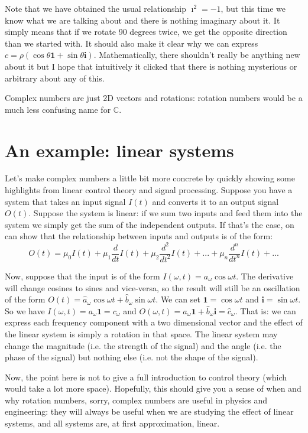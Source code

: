 \documentclass[aps,pra,10pt,floatfix,nofootinbib]{revtex4-1}
\theoremstyle{definition}
\begin{document}
Note that we have obtained the usual relationship $\imath^2=-1$, but this time we know what we are talking about and there is nothing imaginary about it. It simply means that if we rotate 90 degrees twice, we get the opposite direction than we started with. It should also make it clear why we can express $c=\rho (\cos \theta \mathbf{1} + \sin \theta \mathbf{i})$. Mathematically, there shouldn't really be anything new about it but I hope that intuitively it clicked that there is nothing mysterious or arbitrary about any of this.

Complex numbers are just 2D vectors and rotations: rotation numbers would be a much less confusing name for $\mathbb{C}$.

\section{An example: linear systems}

Let's make complex numbers a little bit more concrete by quickly showing some highlights from linear control theory and signal processing. Suppose you have a system that takes an input signal $I(t)$ and converts it to an output signal $O(t)$. Suppose the system is linear: if we sum two inputs and feed them into the system we simply get the sum of the independent outputs. If that's the case, on can show that the relationship between inputs and outputs is of the form:
\begin{equation}
	O(t) = \mu_0 I(t) + \mu_1 \frac{d}{dt} I(t) + \mu_2 \frac{d^2}{dt^2} I(t) + ... + \mu_n \frac{d^n}{dt^n} I(t) + ...
\end{equation}

Now, suppose that the input is of the form $I(\omega, t) = a_\omega \cos \omega t$. The derivative will change cosines to sines and vice-versa, so the result will still be an oscillation of the form $O(t) = \hat{a}_\omega \cos \omega t + \hat{b}_\omega \sin \omega t$. We can set $\mathbf{1} = \cos \omega t$ and $\mathbf{i} = \sin \omega t$. So we have $I(\omega, t) = a_\omega \mathbf{1} = c_\omega$ and $O(\omega, t) = \hat{a}_\omega \mathbf{1} + \hat{b}_\omega \mathbf{i} = \hat{c}_\omega$. That is: we can express each frequency component with a two dimensional vector and the effect of the linear system is simply a rotation in that space. The linear system may change the magnitude (i.e. the strength of the signal) and the angle (i.e. the phase of the signal) but nothing else (i.e. not the shape of the signal).

Now, the point here is not to give a full introduction to control theory (which would take a lot more space). Hopefully, this should give you a sense of when and why rotation numbers, sorry, complex numbers are useful in physics and engineering: they will always be useful when we are studying the effect of linear systems, and all systems are, at first approximation, linear.
\end{document}
